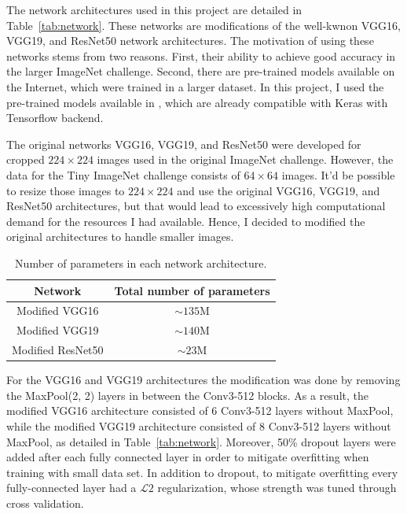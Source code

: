 \documentclass[10pt,twocolumn,letterpaper]{article}
\begin{document}
The network architectures used in this project are detailed in Table~\ref{tab:network}. These networks are modifications of the well-kwnon VGG16, VGG19, \cite{VGGNet} and ResNet50 \cite{ResNet} network architectures. The motivation of using these networks stems from two reasons. First, their ability to achieve good accuracy in the larger ImageNet challenge. Second, there are pre-trained models available on the Internet, which were trained in a larger dataset. In this project, I used the pre-trained models available in \cite{Pretrained-Models}, which are already compatible with Keras with Tensorflow backend.

The original networks VGG16, VGG19, and ResNet50 were developed for cropped $224 \times 224$ images used in the original ImageNet challenge. However, the data for the Tiny ImageNet challenge consists of $64 \times 64$ images. It'd be possible to resize those images to $224 \times 224$ and use the original VGG16, VGG19, and ResNet50 architectures, but that would lead to excessively high computational demand for the resources I had available. Hence, I decided to modified the original architectures to handle smaller images.

\begin{table}[t]
	\caption{Number of parameters in each network architecture.}
	\label{tab:network-complexity}
	\centering
	\begin{tabular}{c|c}
		\hline
		\textbf{Network} & \textbf{Total number of parameters} \\
		\hline
		Modified VGG16 & $\sim135$M \\
		Modified VGG19 & $\sim140$M \\
		Modified ResNet50 & $\sim 23$M\\
		\hline
	\end{tabular}
\end{table}

For the VGG16 and VGG19 architectures the modification was done by removing the MaxPool(2, 2) layers in between the Conv3-512 blocks. As a result, the modified VGG16 architecture consisted of 6 Conv3-512 layers without MaxPool, while the modified VGG19 architecture consisted of 8 Conv3-512 layers without MaxPool, as detailed in Table~\ref{tab:network}. Moreover, 50\% dropout layers were added after each fully connected layer in order to mitigate overfitting when training with small data set. In addition to dropout, to mitigate overfitting every fully-connected layer had a $\mathcal{L}2$ regularization, whose strength was tuned through cross validation.
\end{document}
